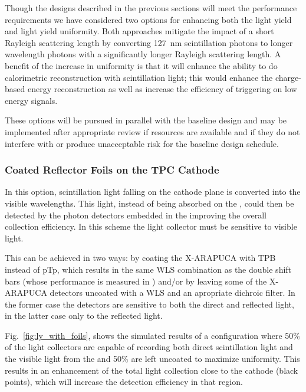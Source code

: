 Though the designs described in the previous sections will meet the  performance requirements we have considered two options for enhancing both the light yield and light yield uniformity.  Both approaches mitigate the impact of a short Rayleigh scattering length by converting \SI{127}{nm} scintillation photons to longer wavelength photons with a significantly longer Rayleigh scattering length. A benefit of the increase in uniformity is that it will enhance the ability to do calorimetric reconstruction with scintillation light; this would enhance the charge-based energy reconstruction as well as increase the efficiency of triggering on low energy signals.

These options will be pursued in parallel with the baseline design and may be implemented after appropriate review if resources are available and if they do not interfere with or produce unacceptable risk for the baseline design schedule.



\subsubsection{Coated Reflector Foils on the TPC Cathode}
\label{sec:fdsp-pd-enh-cathode}

In this option, scintillation light falling on the cathode plane is converted into the visible wavelengths. This light, instead of being absorbed on the , could then be detected by the photon detectors embedded in the  improving the overall collection efficiency. In this scheme the light collector must be sensitive to visible light. 

This can be achieved in two ways: by coating the X-ARAPUCA with TPB instead of pTp, which results in the same WLS combination as the double shift bars (whose performance is measured in )
and/or by leaving some of the X-ARAPUCA detectors uncoated with a WLS and an apropriate dichroic filter. In the former case the detectors are sensitive to both the direct and reflected light, in the latter case only to the reflected light. 

Fig.~\ref{fig:ly_with_foils}, shows the simulated results of a configuration where 50\% of the  light collectors are capable of recording both direct scintillation light and the visible light from the  and 50\% are left uncoated to maximize uniformity. This results in an enhancement of the total light collection close to the cathode (black points), which will increase the detection efficiency in that region. 

